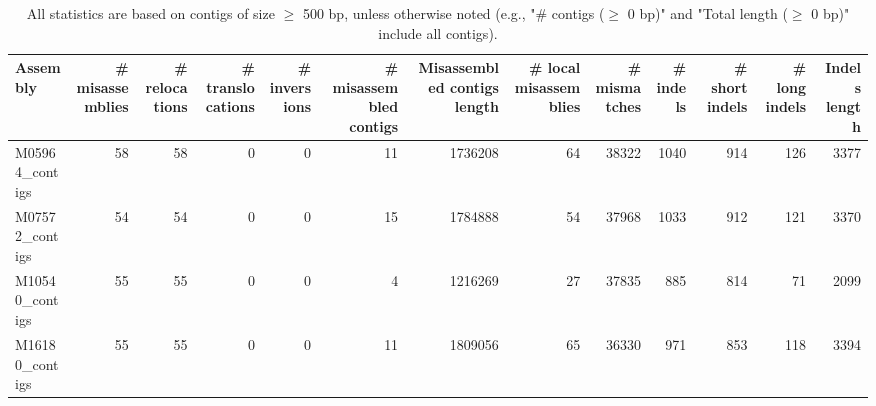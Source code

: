 \documentclass[12pt,a4paper]{article}
\begin{document}
\begin{table}[ht]
\begin{center}
\caption{All statistics are based on contigs of size $\geq$ 500 bp, unless otherwise noted (e.g., "\# contigs ($\geq$ 0 bp)" and "Total length ($\geq$ 0 bp)" include all contigs).}
\begin{tabular}{|l*{12}{|r}|}
\hline
Assembly & \# misassemblies &     \# relocations &     \# translocations &     \# inversions & \# misassembled contigs & Misassembled contigs length & \# local misassemblies & \# mismatches & \# indels &     \# short indels &     \# long indels & Indels length \\ \hline
M05964\_contigs & 58 & 58 & 0 & 0 & 11 & 1736208 & 64 & 38322 & 1040 & 914 & 126 & 3377 \\ \hline
M07572\_contigs & 54 & 54 & 0 & 0 & 15 & 1784888 & 54 & 37968 & 1033 & 912 & 121 & 3370 \\ \hline
M10540\_contigs & 55 & 55 & 0 & 0 & 4 & 1216269 & 27 & 37835 & 885 & 814 & 71 & 2099 \\ \hline
M16180\_contigs & 55 & 55 & 0 & 0 & 11 & 1809056 & 65 & 36330 & 971 & 853 & 118 & 3394 \\ \hline
\end{tabular}
\end{center}
\end{table}
\end{document}
